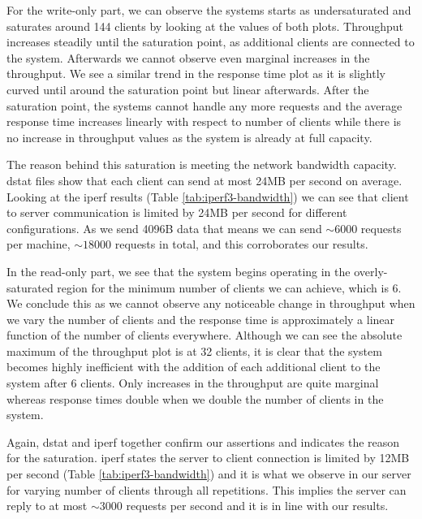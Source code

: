 \documentclass[11pt,a4paper]{article}
\begin{document}
\par For the write-only part, we can observe the systems starts as undersaturated and saturates around 144 clients by looking at the values of both plots. Throughput increases steadily until the saturation point, as additional clients are connected to the system. Afterwards we cannot observe even marginal increases in the throughput. We see a similar trend in the response time plot as it is slightly curved until around the saturation point but linear afterwards. After the saturation point, the systems cannot handle any more requests and the average response time increases linearly with respect to number of clients while there is no increase in throughput values as the system is already at full capacity.
\par The reason behind this saturation is meeting the network bandwidth capacity. dstat files show that each client can send at most 24MB per second on average. Looking at the iperf results (Table \ref{tab:iperf3-bandwidth}) we can see that client to server communication is limited by 24MB per second for different configurations. As we send 4096B data that means we can send $\sim 6000$ requests per machine, $\sim 18000$ requests in total, and this corroborates our results.

\par In the read-only part, we see that the system begins operating in the overly-saturated region for the minimum number of clients we can achieve, which is 6. We conclude this as we cannot observe any noticeable change in throughput when we vary the number of clients and the response time is approximately a linear function of the number of clients everywhere. Although we can see the absolute maximum of the throughput plot is at 32 clients, it is clear that the system becomes highly inefficient with the addition of each additional client to the system after 6 clients. Only increases in the throughput are quite marginal whereas response times double when we double the number of clients in the system.
\par Again, dstat and iperf together confirm our assertions and indicates the reason for the saturation. iperf states the server to client connection is limited by 12MB per second (Table \ref{tab:iperf3-bandwidth}) and it is what we observe in our server for varying number of clients through all repetitions. This implies the server can reply to at most $\sim 3000$ requests per second and it is in line with our results.
\end{document}
